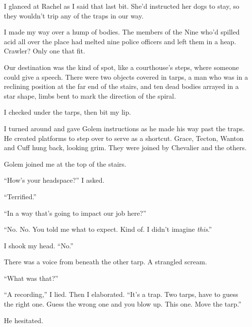 I glanced at Rachel as I said that last bit.  She'd instructed her dogs to stay, so they wouldn't trip any of the traps in our way.



I made my way over a hump of bodies.  The members of the Nine who'd spilled acid all over the place had melted nine police officers and left them in a heap.  Crawler?  Only one that fit.



Our destination was the kind of spot, like a courthouse's steps, where someone could give a speech.  There were two objects covered in tarps, a man who was in a reclining position at the far end of the stairs, and ten dead bodies arrayed in a star shape, limbs bent to mark the direction of the spiral.



I checked under the tarps, then bit my lip.



I turned around and gave Golem instructions as he made his way past the traps.  He created platforms to step over to serve as a shortcut.  Grace, Tecton, Wanton and Cuff hung back, looking grim.  They were joined by Chevalier and the others.



Golem joined me at the top of the stairs.



``How's your headspace?'' I asked.



``Terrified.''



``In a way that's going to impact our job here?''



``No.  No.  You told me what to expect.  Kind of.  I didn't imagine \emph{this}.''



I shook my head.  ``No.''



There was a voice from beneath the other tarp.  A strangled scream.



``What was that?''



``A recording,'' I lied.  Then I elaborated.  ``It's a trap.  Two tarps, have to guess the right one.  Guess the wrong one and you blow up.  This one.  Move the tarp.''



He hesitated.



